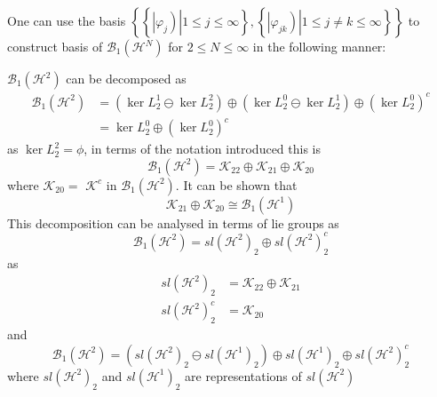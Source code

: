 \documentclass[aps,preprint]{revtex4}%
\begin{document}
One can use the basis $\left\{  \left\{  \left.  \left\vert \varphi
_{j}\right)  \right\vert 1\leq j\leq\infty\right\}  ,\left\{  \left.
\left\vert \varphi_{jk}\right)  \right\vert 1\leq j\neq k\leq\infty\right\}
\right\}  $ to construct basis of $\mathcal{B}_{1}\left(  \mathcal{H}%
^{N}\right)  $ for $2\leq N\leq\infty$ in the following manner:

$\mathcal{B}_{1}\left(  \mathcal{H}^{2}\right)  $ can be decomposed as
\begin{align}
\mathcal{B}_{1}\left(  \mathcal{H}^{2}\right)   &  =\left(  \ker L_{2}%
^{1}\ominus\ker L_{2}^{2}\right)  \oplus\left(  \ker L_{2}^{0}\ominus\ker
L_{2}^{1}\right)  \oplus\left(  \ker L_{2}^{0}\right)  ^{c}\nonumber\\
&  =\ker L_{2}^{0}\oplus\left(  \ker L_{2}^{0}\right)  ^{c}%
\end{align}
as $\ker L_{2}^{2}=\phi$, in terms of the notation introduced this is
\begin{equation}
\mathcal{B}_{1}\left(  \mathcal{H}^{2}\right)  =\mathcal{K}_{22}%
\oplus\mathcal{K}_{21}\oplus\mathcal{K}_{20}%
\end{equation}
where $\mathcal{K}_{20}=$ $\mathcal{K}^{c}$ in $\mathcal{B}_{1}\left(
\mathcal{H}^{2}\right)  .$ It can be shown that
\begin{equation}
\mathcal{K}_{21}\oplus\mathcal{K}_{20}\cong\mathcal{B}_{1}\left(
\mathcal{H}^{1}\right)
\end{equation}
This decomposition can be analysed in terms of lie groups as
\begin{equation}
\mathcal{B}_{1}\left(  \mathcal{H}^{2}\right)  =sl\left(  \mathcal{H}%
^{2}\right)  _{2}\oplus sl\left(  \mathcal{H}^{2}\right)  _{2}^{c}%
\end{equation}
as
\begin{align}
sl\left(  \mathcal{H}^{2}\right)  _{2} &  =\mathcal{K}_{22}\oplus
\mathcal{K}_{21}\nonumber\\
sl\left(  \mathcal{H}^{2}\right)  _{2}^{c} &  =\mathcal{K}_{20}%
\end{align}
and
\begin{equation}
\mathcal{B}_{1}\left(  \mathcal{H}^{2}\right)  =\left(  sl\left(
\mathcal{H}^{2}\right)  _{2}\ominus sl\left(  \mathcal{H}^{1}\right)
_{2}\right)  \oplus sl\left(  \mathcal{H}^{1}\right)  _{2}\oplus sl\left(
\mathcal{H}^{2}\right)  _{2}^{c}%
\end{equation}
where $sl\left(  \mathcal{H}^{2}\right)  _{2}$ and $sl\left(  \mathcal{H}%
^{1}\right)  _{2}$ are representations of $sl\left(  \mathcal{H}^{2}\right)  $
\end{document}
